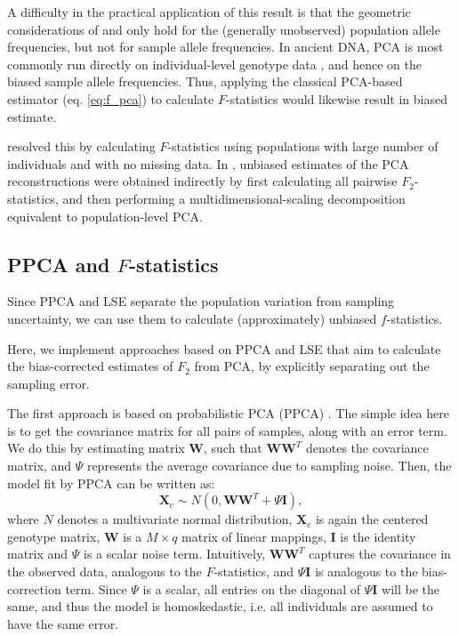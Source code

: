 \documentclass[12pt]{article}
\newcommand{\BW}{\mathbf{W}}
\newcommand{\BI}{\mathbf{I}}
\newcommand{\MX}{\mathbf{X}}
\begin{document}
A difficulty in the practical application of this result is that the geometric considerations of \cite{oteo-garcia_geometrical_2021} and \cite{peter_geometric_2022} only hold for the (generally unobserved) population allele frequencies, but not for sample allele frequencies. In ancient DNA, PCA is most commonly run directly on individual-level genotype data \citep{patterson_population_2006}, and hence on the biased sample allele frequencies. Thus, applying the classical PCA-based estimator (eq. \ref{eq:f_pca}) to calculate $F$-statistics would likewise result in biased estimate.


\cite{oteo-garcia_geometrical_2021} resolved this by calculating $F$-statistics using populations with large number of individuals and with no missing data. In \cite{peter_geometric_2022}, unbiased estimates of the PCA reconstructions were obtained indirectly by first calculating all pairwise $F_2$-statistics, and then performing a multidimensional-scaling decomposition equivalent to population-level PCA. 

\subsection{PPCA and $F$-statistics}\label{theory-ppca}
Since PPCA and LSE separate the population variation from sampling uncertainty, we can use them to calculate (approximately) unbiased $f$-statistics.

Here, we implement approaches based on PPCA and LSE that aim to calculate the bias-corrected estimates of $F_2$ from  PCA, by explicitly separating out the sampling error.

The first approach is based on probabilistic PCA (PPCA) \citep{tipping_probabilistic_1999-1, agrawal_scalable_2020}. The simple idea here is to get the covariance matrix for all pairs of samples, along with an error term. We do this by estimating matrix $\BW$, such that $\mathbf{W}\mathbf{W}^T$ denotes the covariance matrix, and $\Psi$ represents the average covariance due to sampling noise. Then, the model fit by PPCA can be written as: 
\begin{equation*}
    \MX_c \sim N(0, \mathbf{W}\mathbf{W}^T + \Psi \BI),
\end{equation*} 
where $N$ denotes a multivariate normal distribution, $\MX_c$ is again the centered genotype matrix, $\mathbf{W}$ is a $M \times q$ matrix of linear mappings, $\BI$ is the identity matrix and $\Psi$ is a scalar noise term. Intuitively, $\mathbf{W}\mathbf{W}^T$ captures the covariance in the observed data, analogous to the $F$-statistics, and $\Psi \BI$ is analogous to the bias-correction term. Since $\Psi$ is a scalar, all entries on the diagonal of $\Psi \BI$ will be the same, and thus the model is homoskedastic, i.e. all individuals are assumed to have the same error.
\end{document}
